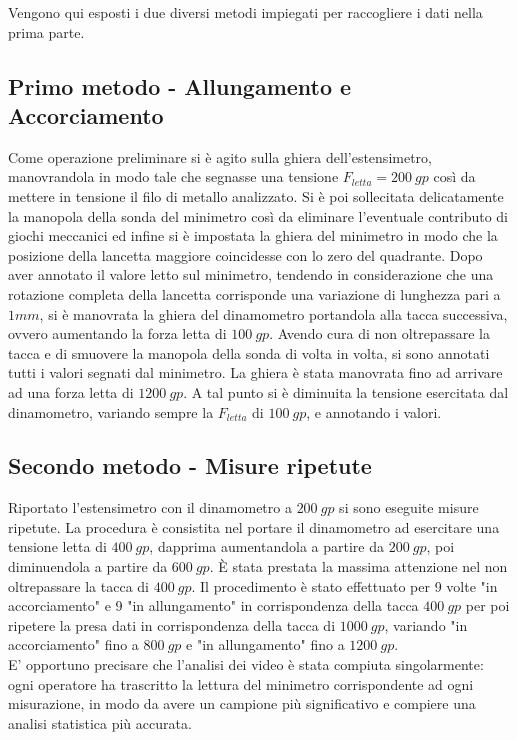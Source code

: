 \documentclass[a4paper,11pt,oneside]{article}
\begin{document}
Vengono qui esposti i due diversi metodi impiegati per raccogliere i dati nella prima parte.

\subsection{Primo metodo - Allungamento e Accorciamento}\label{sec:miglior_metodo_misura}%
Come operazione preliminare si è agito sulla ghiera dell'estensimetro, manovrandola in modo tale che segnasse una tensione $F_{letta}=\SI{200}{gp}$ così da mettere in tensione il filo di metallo analizzato. Si è poi sollecitata delicatamente la manopola della sonda del minimetro così da eliminare l'eventuale contributo di giochi meccanici ed infine si è impostata la ghiera del minimetro in modo che la posizione della lancetta maggiore coincidesse con lo zero del quadrante. Dopo aver annotato il valore letto sul minimetro, tendendo in considerazione che una rotazione completa della lancetta corrisponde una variazione di lunghezza pari a $\num{1} \si{mm}$, si è manovrata la ghiera del dinamometro portandola alla tacca successiva, ovvero aumentando la forza letta di $\SI{100}{gp}$. Avendo cura di non oltrepassare la tacca e di smuovere la manopola della sonda di volta in volta, si sono annotati tutti i valori segnati dal minimetro. La ghiera è stata manovrata fino ad arrivare ad una forza letta di $\SI{1200}{gp}$. A tal punto si è diminuita la tensione esercitata dal dinamometro, variando sempre la $F_{letta}$ di $\SI{100}{gp}$, e annotando i valori.\\

\subsection{Secondo metodo - Misure ripetute}%
Riportato l'estensimetro con il dinamometro a $\SI{200}{gp}$ si sono eseguite misure ripetute. La procedura è consistita nel portare il dinamometro ad esercitare una tensione letta di $\SI{400}{gp}$, dapprima aumentandola a partire da $\SI{200}{gp}$, poi diminuendola a partire da $\SI{600}{gp}$. È stata prestata la massima attenzione nel non oltrepassare la tacca di $\SI{400}{gp}$.
Il procedimento è stato effettuato per 9 volte "in accorciamento" e 9 "in allungamento" in corrispondenza della tacca $\SI{400}{gp}$ per poi ripetere la presa dati in corrispondenza della tacca di $\SI{1000}{gp}$, variando "in accorciamento" fino a $\SI{800}{gp}$ e "in allungamento" fino a $\SI{1200}{gp}$.\\
E' opportuno precisare che l'analisi dei video è stata compiuta singolarmente: ogni operatore ha trascritto la lettura del minimetro corrispondente ad ogni misurazione, in modo da avere un campione più significativo e compiere una analisi statistica più accurata.
\end{document}
